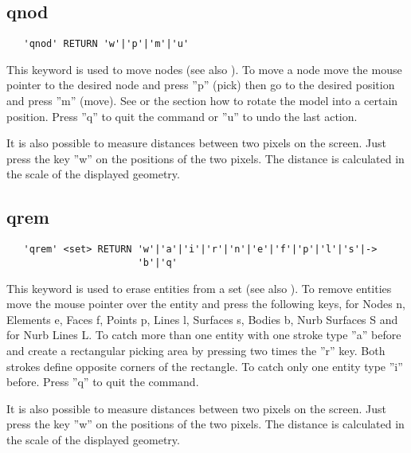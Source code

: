 \documentclass{article}
\begin{document}
\subsection{\label{qnod}qnod}
\begin{verbatim}
   'qnod' RETURN 'w'|'p'|'m'|'u'
\end{verbatim}
This keyword is used to move nodes (see also ). To move a node move the mouse pointer to the desired node and press ''p'' (pick) then go to the desired position and press ''m'' (move). See  or the section  how to rotate the model into a certain position. Press ''q'' to quit the command or ''u'' to undo the last action. 

It is also possible to measure distances between two pixels on the screen. Just press the key ''w'' on the positions of the two pixels. The distance is calculated in the scale of the displayed geometry.  

\subsection{\label{qrem}qrem}
\begin{verbatim}
   'qrem' <set> RETURN 'w'|'a'|'i'|'r'|'n'|'e'|'f'|'p'|'l'|'s'|->
                       'b'|'q' 
\end{verbatim}
This keyword is used to erase entities from a set (see also ). To remove entities move the mouse pointer over the entity and press the following keys, for Nodes n, Elements e, Faces f, Points p, Lines l, Surfaces s, Bodies b, Nurb Surfaces S and for Nurb Lines L. To catch more than one entity with one stroke type ''a'' before and create a rectangular picking area by pressing two times the ''r'' key. Both strokes define opposite corners of the rectangle. To catch only one entity type ''i'' before. Press ''q'' to quit the command. 

It is also possible to measure distances between two pixels on the screen. Just press the key ''w'' on the positions of the two pixels. The distance is calculated in the scale of the displayed geometry.
\end{document}

